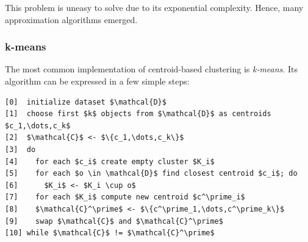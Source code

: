 This problem is uneasy to solve due to its exponential complexity. Hence, many approximation algorithms emerged. 

\subsubsection{k-means}

The most common implementation of centroid-based clustering is \emph{k-means}. Its algorithm can be expressed in a few simple steps:

\begin{Verbatim}[commandchars=\\\{\},codes={\catcode`$=3\catcode`^=7\catcode`_=8},frame=lines,label=$k$-means]
[0]  initialize dataset $\mathcal{D}$
[1]  choose first $k$ objects from $\mathcal{D}$ as centroids $c_1,\dots,c_k$ 
[2]  $\mathcal{C}$ <- $\{c_1,\dots,c_k\}$
[3]  do
[4]    for each $c_i$ create empty cluster $K_i$
[5]    for each $o \in \mathcal{D}$ find closest centroid $c_i$; do
[6]      $K_i$ <- $K_i \cup o$
[7]    for each $K_i$ compute new centroid $c^\prime_i$
[8]    $\mathcal{C}^\prime$ <- $\{c^\prime_1,\dots,c^\prime_k\}$
[9]    swap $\mathcal{C}$ and $\mathcal{C}^\prime$
[10] while $\mathcal{C}$ != $\mathcal{C}^\prime$
\end{Verbatim}



